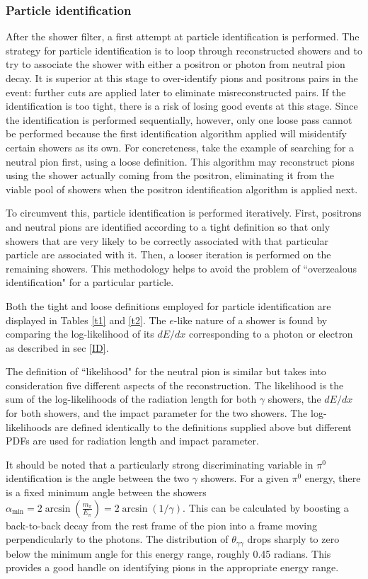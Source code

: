 \documentclass[a4paper, 10pt]{article}
\begin{document}
\subsubsection{Particle identification}

After the shower filter, a first attempt at particle identification is performed. The strategy for particle identification is to loop through reconstructed showers and to try to associate the shower with either a positron or photon from neutral pion decay. It is superior at this stage to over-identify pions and positrons pairs in the event: further cuts are applied later to eliminate misreconstructed pairs. If the identification is too tight, there is a risk of losing good events at this stage. Since the identification is performed sequentially, however, only one loose pass cannot be performed because the first identification algorithm applied will misidentify certain showers as its own. For concreteness, take the example of searching for a neutral pion  first, using a loose definition. This algorithm may reconstruct pions using the shower actually coming from the positron, eliminating it from the viable pool of showers when the positron identification algorithm is applied next.

To circumvent this, particle identification is performed iteratively. First, positrons and neutral pions are identified according to a tight definition so that only showers that are very likely to be correctly associated with that particular particle are associated with it. Then, a looser iteration is performed on the remaining showers. This methodology helps to avoid the problem of ``overzealous identification" for a particular particle.

Both the tight and loose definitions employed for particle identification are displayed in Tables \ref{t1} and \ref{t2}. The $e$-like nature of a shower is found by comparing the log-likelihood of its $dE/dx$ corresponding to a photon or electron as described in sec \ref{ID}. 

The definition of ``likelihood" for the neutral pion is similar but takes into consideration five different aspects of the reconstruction. The likelihood is the sum of the log-likelihoods of the radiation length for both $\gamma$ showers, the $dE/dx$ for both showers, and the impact parameter for the two showers. The log-likelihoods are defined identically to the definitions supplied above but different PDFs are used for radiation length and impact parameter.

It should be noted that a particularly strong discriminating variable in $\pi^{0}$ identification is the angle between the two $\gamma$ showers. For a given $\pi^{0}$ energy, there is a fixed minimum angle between the showers $\alpha_{\text{min}} = 2\arcsin(\frac{m_{\pi}}{E_{\pi}}) = 2\arcsin(1/\gamma)$. This can be calculated by boosting a back-to-back decay from the rest frame of the pion into a frame moving perpendicularly to the photons. The distribution of $\theta_{\gamma\gamma}$ drops sharply to zero below the minimum angle for this energy range, roughly 0.45 radians. This provides a good handle on identifying pions in the appropriate energy range.
\end{document}
